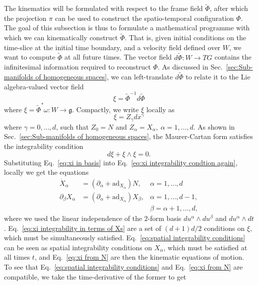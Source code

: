 The kinematics will be formulated with respect to the frame field $\tilde{\Phi}$, after which the projection $\pi$ can be used to construct the spatio-temporal configuration $\Phi$. The goal of this subsection is thus to formulate a mathematical programme with which we can kinematically construct $\tilde{\Phi}$. That is, given initial conditions on the time-slice at the initial time boundary, and a velocity field defined over $W$, we want to compute $\tilde{\Phi}$ at all future times. The vector field $d \tilde{\Phi} : W \to TG$ contains the infinitesimal information required to reconstruct $\Phi$. As discussed in Sec.~\ref{sec:Sub-manifolds of homogeneous spaces}, we can left-translate $d \tilde{\Phi}$ to relate it to the Lie algebra-valued vector field
\begin{equation} \label{eq:xi and Phi relation}
\xi = \tilde{\Phi}^{-1} d \tilde{\Phi}
\end{equation}
where $\xi = \tilde{\Phi}^* \omega : W \to \mathfrak{g}$. Compactly, we write $\xi$ locally as
\begin{equation}
\xi = Z_\gamma d x^\gamma
\end{equation}
where $\gamma = 0, \dots, d$, such that $Z_0 = N$ and $Z_\alpha = X_\alpha,\ \alpha = 1, \dots, d$. As shown in Sec.~\ref{sec:Sub-manifolds of homogeneous spaces}, the Maurer-Cartan form satisfies the integrability condition
\begin{equation} \label{eq:xi integrability condtion again}
d \xi + \xi \wedge \xi = 0.
\end{equation}
Substituting Eq.~\ref{eq:xi in basis} into Eq.~\ref{eq:xi integrability condtion again}, locally we get the equations
\begin{subequations} \label{eq:xi integrability in terms of Xs}
\begin{align}
\dot{X}_\alpha & = (\partial_{\alpha} + \text{ad}_{X_\alpha}) N, & \alpha = 1, \dots, d \label{eq:xi from N} \\
\partial_\beta X_\alpha  & = (\partial_\alpha + \text{ad}_{X_\alpha}) X_\beta, & \alpha = 1, \dots, d-1, \label{eq:spatial integrability conditions} \\
& & \beta = \alpha+1, \dots, d \nonumber,
\end{align}
\end{subequations}
where we used the linear independence of the $2$-form basis $d u^\alpha \wedge d u^\beta$ and $d u^\alpha \wedge dt$. Eq.~\ref{eq:xi integrability in terms of Xs} are a set of $(d+1)d/2$ conditions on $\xi$, which must be simultaneously satisfied. Eq.~\ref{eq:spatial integrability conditions} can be seen as spatial integrability conditions on $X_\alpha$, which must be satisfied at all times $t$, and Eq.~\ref{eq:xi from N} are then the kinematic equations of motion. To see that Eq.~\ref{eq:spatial integrability conditions} and Eq.~\ref{eq:xi from N} are compatible, we take the time-derivative of the former to get
